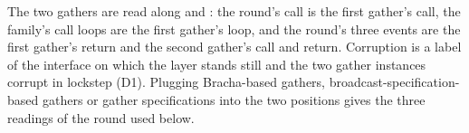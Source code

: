 \begin{definition}
  The two gathers are read along  and : the round's call is the first gather's call, the family's call loops are the first gather's loop, and the round's three events are the first gather's return and the second gather's call and return.
  Corruption is a label of the interface on which the layer stands still and the two gather instances corrupt in lockstep (D1).
  Plugging Bracha-based gathers, broadcast-specification-based gathers or gather specifications into the two positions gives the three readings of the round used below.
\end{definition}
